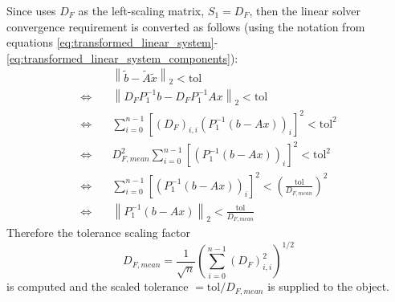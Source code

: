 Since {\kinsol} uses $D_F$ as the left-scaling matrix, $S_1 = D_F$,
then the linear solver convergence requirement is converted as follows
(using the notation from equations
\eqref{eq:transformed_linear_system}-\eqref{eq:transformed_linear_system_components}): 
\begin{align*}
  &\left\| \tilde{b} - \tilde{A} \tilde{x} \right\|_2  <  \text{tol}\\
  \Leftrightarrow \quad & \left\| D_F P_1^{-1} b - D_F P_1^{-1} A x \right\|_2  <  \text{tol}\\
  \Leftrightarrow \quad & \sum_{i=0}^{n-1} \left[(D_F)_{i,i} \left(P_1^{-1} (b - A x)\right)_i\right]^2  <  \text{tol}^2\\
  \Leftrightarrow \quad & D_{F,mean}^2 \sum_{i=0}^{n-1} \left[\left(P_1^{-1} (b - A x)\right)_i\right]^2  <  \text{tol}^2\\
  \Leftrightarrow \quad & \sum_{i=0}^{n-1} \left[\left(P_1^{-1} (b - A x)\right)_i\right]^2  <  \left(\frac{\text{tol}}{D_{F,mean}}\right)^2\\
  \Leftrightarrow \quad & \left\| P_1^{-1} (b - A x)\right\|_2  <  \frac{\text{tol}}{D_{F,mean}}
\end{align*}
Therefore the tolerance scaling factor
\[
  D_{F,mean} = \frac{1}{\sqrt{n}}\left(\sum_{i=0}^{n-1} (D_F)_{i,i}^2\right)^{1/2}
\]
is computed and the scaled tolerance $= \text{tol} / D_{F,mean}$ is
supplied to the {\sunlinsol} object.















